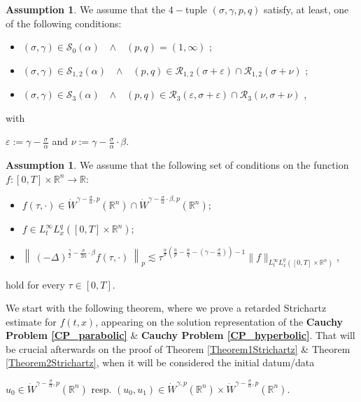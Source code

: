\documentclass{amsart}
\theoremstyle{definition}
\newtheorem{assumption}[theorem]{Assumption}
\theoremstyle{remark}
\numberwithin{equation}{section}
\newcommand{\BR}{{\mathbb R}}
\begin{document}
		\begin{assumption}\label{AssumptionParameters}
			We assume that the $4-$tuple $(\sigma,\gamma,p,q)$ satisfy, at least, one of the following conditions:
			\begin{itemize}
				\item[\bf (i)] $(\sigma,\gamma)\in \mathcal{S}_{0}(\alpha)$~~$\wedge$~~$(p,q)=(1,\infty)$ ;
				\item[\bf (ii)] $(\sigma,\gamma)\in \mathcal{S}_{1,2}(\alpha)$~~$\wedge$~~$(p,q)\in \mathcal{R}_{1,2}\left(\sigma+\varepsilon\right)\cap  \mathcal{R}_{1,2}\left(\sigma+\nu\right)$ ;
				\item[\bf (iii)] $(\sigma,\gamma)\in \mathcal{S}_{3}(\alpha)$~~$\wedge$~~$(p,q)\in \mathcal{R}_{3}\left(\varepsilon,\sigma+\varepsilon\right)\cap \mathcal{R}_{3}\left(\nu,\sigma+\nu\right)$  ,
			\end{itemize}
			with
			\begin{center}
				$\displaystyle \varepsilon:=\gamma-\frac{\sigma}{\alpha}$ and $\displaystyle \nu:=\gamma-\frac{\sigma}{\alpha}\cdot \beta.$
			\end{center}
		\end{assumption}
		\begin{assumption}\label{AssumptionF}
			We assume that the following set of conditions on the function $f:[0,T]\times \BR^n\longrightarrow \BR$:
			\begin{itemize}
				\item[\bf (I)] $f(\tau,\cdot)\in \dot{W}^{\gamma-\frac{\sigma}{\alpha},p}(\BR^n)\cap \dot{W}^{\gamma-\frac{\sigma}{\alpha}\cdot\beta,p}(\BR^n)$;
				\item[\bf (II)] $f\in L^\infty_tL^q_x([0,T]\times\BR^n)$;
				\item[\bf (III)] $\displaystyle \left\|~(-\Delta)^{\frac{\gamma}{2}-\frac{\sigma}{2\alpha}\cdot\beta} f(\tau,\cdot)~\right\|_p\lesssim \tau^{\frac{\alpha}{\sigma}\left(\frac{n}{p}-\frac{n}{q}-\left(\gamma-\frac{\sigma}{\alpha}\right)\right)-1} \|f\|_{L^\infty_tL^q_x([0,T]\times\BR^n)}$,
			\end{itemize}
			hold for every $\tau\in [0,T]$.
		\end{assumption}
		
		
		We start with the following theorem, where we prove a retarded Strichartz estimate for $f(t,x)$, appearing on the solution representation of the {\bf Cauchy Problem \ref{CP_parabolic}} \& {\bf Cauchy Problem \ref{CP_hyperbolic}}. That will be crucial afterwards on the proof of Theorem \ref{Theorem1Strichartz} \& Theorem \ref{Theorem2Strichartz}, when it will be considered the initial datum/data 
		\begin{center}
			$u_0\in \dot{W}^{\gamma-\frac{\sigma}{\alpha},p}(\BR^n)$ resp. $(u_0,u_1)\in \dot{W}^{\gamma,p}(\BR^n)\times \dot{W}^{\gamma-\frac{\sigma}{\alpha},p}(\BR^n)$.
		\end{center}
		
\end{document}
